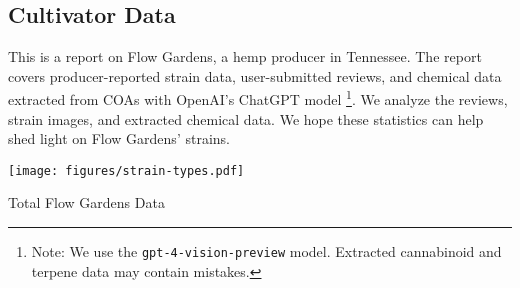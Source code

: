 \documentclass[../article.tex, 12pt]{subfiles}
\begin{document}
%


\begin{multicols}{2}
\section*{Cultivator Data}
\label{sec:introduction}
\thispagestyle{regular}

This is a report on Flow Gardens, a hemp producer in Tennessee. The report covers producer-reported strain data, user-submitted reviews, and chemical data extracted from COAs with OpenAI's ChatGPT model \footnote[1]{Note: We use the \texttt{gpt-4-vision-preview} model. Extracted cannabinoid and terpene data may contain mistakes.}. We analyze the reviews, strain images, and extracted chemical data. We hope these statistics can help shed light on Flow Gardens' strains.

\texttt{[image: figures/strain-types.pdf]}

\end{multicols}

{\small
\begin{flushleft}

\end{flushleft}
}

{\small
\noindent Total Flow Gardens Data\\[0.25\baselineskip]

}
\end{document}
